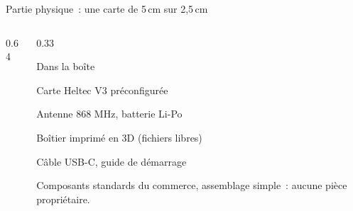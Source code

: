 \begin{frame}{Partie physique~: une carte de 5\,cm sur 2,5\,cm}
\begin{columns}[T]
\begin{column}{0.64\textwidth}
    \end{column}
    \begin{column}{0.33\textwidth}
      \begin{encadre}{Dans la boîte}
        \begin{puces}
          \item Carte Heltec V3 préconfigurée
          \item Antenne 868 MHz, batterie Li-Po
          \item Boîtier imprimé en 3D (fichiers libres)
          \item Câble USB-C, guide de démarrage
        \end{puces}
      \end{encadre}
      \vspace{0.12cm}
      \begin{pointcle}\centering\footnotesize
        Composants standards du commerce, assemblage simple~: aucune pièce propriétaire.
      \end{pointcle}
    \end{column}
  \end{columns}
\end{frame}

